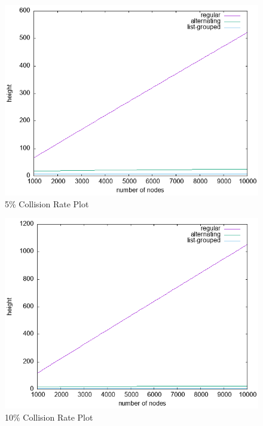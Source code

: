 \documentclass[fleqn,10pt]{SelfArx} %
\begin{document}
\begin{figure}[ht]
	\includegraphics[width=\linewidth]{Figures/5_plot.png}
	\caption{5\% Collision Rate Plot}
	\label{fig:5_plot}
\end{figure}

\begin{figure}[ht]
	\includegraphics[width=\linewidth]{Figures/10_plot.png}
	\caption{10\% Collision Rate Plot}
	\label{fig:10_plot}
\end{figure}
\end{document}

